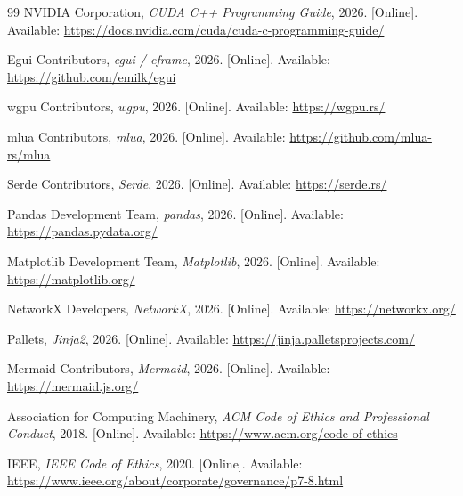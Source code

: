 \begin{thebibliography}{99}
NVIDIA Corporation,
\textit{CUDA C++ Programming Guide}, 2026.
[Online]. Available: \url{https://docs.nvidia.com/cuda/cuda-c-programming-guide/}

Egui Contributors,
\textit{egui / eframe}, 2026.
[Online]. Available: \url{https://github.com/emilk/egui}

wgpu Contributors,
\textit{wgpu}, 2026.
[Online]. Available: \url{https://wgpu.rs/}

mlua Contributors,
\textit{mlua}, 2026.
[Online]. Available: \url{https://github.com/mlua-rs/mlua}

Serde Contributors,
\textit{Serde}, 2026.
[Online]. Available: \url{https://serde.rs/}

Pandas Development Team,
\textit{pandas}, 2026.
[Online]. Available: \url{https://pandas.pydata.org/}

Matplotlib Development Team,
\textit{Matplotlib}, 2026.
[Online]. Available: \url{https://matplotlib.org/}

NetworkX Developers,
\textit{NetworkX}, 2026.
[Online]. Available: \url{https://networkx.org/}

Pallets,
\textit{Jinja2}, 2026.
[Online]. Available: \url{https://jinja.palletsprojects.com/}

Mermaid Contributors,
\textit{Mermaid}, 2026.
[Online]. Available: \url{https://mermaid.js.org/}

Association for Computing Machinery,
\textit{ACM Code of Ethics and Professional Conduct}, 2018.
[Online]. Available: \url{https://www.acm.org/code-of-ethics}

IEEE,
\textit{IEEE Code of Ethics}, 2020.
[Online]. Available: \url{https://www.ieee.org/about/corporate/governance/p7-8.html}

\end{thebibliography}
